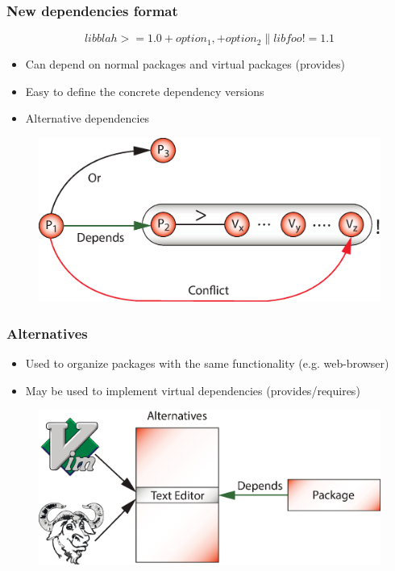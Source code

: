 \documentclass{beamer}
\begin{document}
\begin{frame}
\frametitle{New dependencies format}
\large{\[libblah >= 1.0 +option_1, +option_2 \| libfoo != 1.1\]}
\begin{itemize}
  \item Can depend on normal packages and virtual packages (provides)
  \item Easy to define the concrete dependency versions
  \item Alternative dependencies
\end{itemize}
\begin{figure}[h!]
  \centering
  \includegraphics[height=0.3\textheight]{q6.eps}
\end{figure}
\end{frame}

\begin{frame}
\frametitle{Alternatives}
\begin{itemize}
  \item Used to organize packages with the same functionality (e.g.
  web-browser)
  \item May be used to implement virtual dependencies (provides/requires)
\end{itemize}
\begin{figure}[h!]
  \centering
  \includegraphics[height=0.4\textheight]{q7.eps}
\end{figure}
\end{frame}
\end{document}
